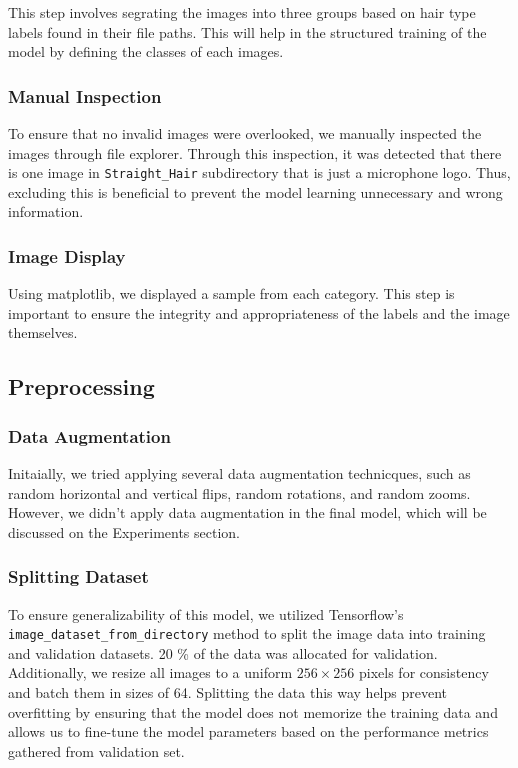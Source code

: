This step involves segrating the images into three groups based on hair type labels found in their file paths. This will help in the structured training of the model by defining the classes of each images.

\subsubsection{Manual Inspection}

To ensure that no invalid images were overlooked, we manually inspected the images through file explorer. Through this inspection, it was detected that there is one image in \texttt{Straight\_Hair} subdirectory that is just a microphone logo. Thus, excluding this is beneficial to prevent the model learning unnecessary and wrong information.

\subsubsection{Image Display}

Using matplotlib, we displayed a sample from each category. This step is important to ensure the integrity and appropriateness of the labels and the image themselves.

\subsection{Preprocessing}

\subsubsection{Data Augmentation}

Initaially, we tried applying several data augmentation technicques, such as random horizontal and vertical flips, random rotations, and random zooms. However, we didn't apply data augmentation in the final model, which will be discussed on the Experiments section.

\subsubsection{Splitting Dataset}

To ensure generalizability of this model, we utilized Tensorflow's \texttt{image\_dataset\_from\_directory} method to split the image data into training and validation datasets. 20 \% of the data was allocated for validation. Additionally, we resize all images to a uniform \(256 \times 256\) pixels for consistency and batch them in sizes of 64. Splitting the data this way helps prevent overfitting by ensuring that the model does not memorize the training data and allows us to fine-tune the model parameters based on the performance metrics gathered from validation set.

